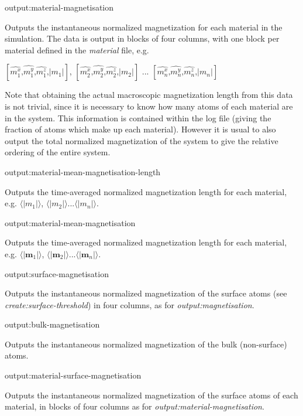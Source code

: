 {\zicf output:material-magnetisation} Outputs the instantaneous normalized magnetization for each material in the simulation. The data is output in blocks of four columns, with one block per material defined in
the \textit{material} file, e.g.

\begin{center}
$\left[ \hat{m_1^x} \textrm{,} \hat{m_1^y} \textrm{,} \hat{m_1^z} \textrm{,} |m_1| \right]$,
$\left[ \hat{m_2^x} \textrm{,} \hat{m_2^y} \textrm{,} \hat{m_2^z} \textrm{,} |m_2| \right]$ ...
$\left[ \hat{m_n^x} \textrm{,} \hat{m_n^y} \textrm{,} \hat{m_n^z} \textrm{,} |m_n| \right]$
\end{center}

Note that obtaining the actual macroscopic magnetization length from this data is not trivial, since it is necessary to know how many atoms of each material are in the system. This information is contained within the log file (giving the fraction of atoms which make up each material). However it is usual to also output the total normalized magnetization of the system to give the relative ordering of the entire system.

{\zicf output:material-mean-magnetisation-length}
Outputs the time-averaged normalized magnetization length for each material, e.g. $\langle|m_1|\rangle$, $\langle|m_2|\rangle$...$\langle|m_n|\rangle$.

{\zicf output:material-mean-magnetisation} Outputs the time-averaged normalized magnetization length for each material, e.g. $\langle|\mathbf{m}_1|\rangle$, $\langle|\mathbf{m}_2|\rangle$...$\langle|\mathbf{m}_n|\rangle$.

{\zicf output:surface-magnetisation} Outputs the instantaneous normalized magnetization of the surface atoms (see \textit{create:surface-threshold}) in four columns, as for \textit{output:magnetisation}.

{\zicf output:bulk-magnetisation} Outputs the instantaneous normalized magnetization of the bulk (non-surface) atoms.

{\zicf output:material-surface-magnetisation} Outputs the instantaneous normalized magnetization of the surface atoms of each material, in blocks of four columns as for \textit{output:material-magnetisation}.

